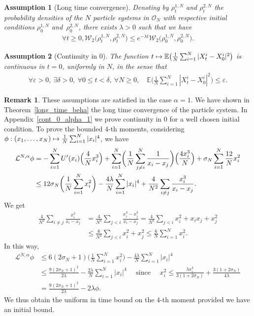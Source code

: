 \documentclass[10pt]{amsart}
\newcommand\mto{\mathchoice{\longmapsto}{\mapsto}{\mapsto}{\mapsto}}
\let\epsilon\varepsilon
\theoremstyle{plain}
\newtheorem{assumption}{Assumption}
\theoremstyle{definition}
\newtheorem{remark}{Remark}[section]
\begin{document}
\begin{assumption}[Long time convergence]\label{Hyp_long_time_cv}
Denoting by $\rho^{1,N}_t$ and $\rho^{2,N}_t$ the probability densities of the $N$ particle systems in $\mathcal{O}_N$ with respective initial conditions $\rho^{1,N}_0$ and~$\rho^{2,N}_0$, there exists $\lambda>0$ such that we have
\begin{align*}
\forall t\geq0, \mathcal{W}_2\bigl(\rho^{1,N}_t,\rho^{2,N}_t\bigr)\leq e^{-\lambda t}\mathcal{W}_2\bigl(\rho^{1,N}_0,\rho^{2,N}_0\bigr).
\end{align*}
\end{assumption}

\begin{assumption}[Continuity in 0]\label{Hyp_cont}
The function $t\mto\mathbb{E}\bigl(\frac{1}{N}\sum_{i=1}^N|X^i_t-X^i_0|^2\bigr)$ is continuous in $t=0$, uniformly in $N$, in the sense that
\begin{align*}
\forall \epsilon>0,\ \exists \delta>0,\ \forall 0\leq t<\delta,\ \forall N\geq0,\quad \mathbb{E}\biggl(\frac{1}{N}\sum_{i=1}^N|X^i_t-X^i_0|^2\biggr)\leq\epsilon.
\end{align*}
\end{assumption}

\begin{remark}
These assumptions are satisfied in the case $\alpha=1$. We have shown in Theorem~\ref{long_time_beha} the long time convergence of the particle system. In Appendix~\ref{cont_0_alpha_1} we prove continuity in 0 for a well chosen initial condition. To prove the bounded 4-th moments, considering $\phi:(x_1,\dots,x_N)\mto \frac{1}{N}\sum_{i=1}^N|x_i|^4$, we have
\begin{align*}
\mathcal{L}^{N,\alpha}\phi&=-\sum_{i=1}^NU'(x_i)\Bigl(\frac{4}{N}x_i^3\Bigr)+\sum_{i=1}^N\biggl(\frac{1}{N}\sum_{j\neq i}^N\frac{1}{x_i-x_j}\biggr)\Bigl(\frac{4x_i^3}{N}\Bigr)+\sigma_N\sum_{i=1}^N \frac{12}{N}x_i^2\\
&\leq 12\sigma_N\biggl(\frac{1}{N}\sum_{i=1}^N x_i^2\biggr)-\frac{4\lambda}{N}\sum_{i=1}^N|x_i|^4+\frac{4}{N^2}\sum_{i\neq j}\frac{x_i^3}{x_i-x_j}.
\end{align*}
We get
\begin{align*}
\frac{4}{N^2}\sum_{i\neq j}\frac{x_i^3}{x_i-x_j}&=\frac{4}{N^2}\sum_{j< i}\frac{x_i^3-x_j^3}{x_i-x_j}=\frac{4}{N^2}\sum_{j< i}x_i^2+x_ix_j+x_j^2\\
&\leq\frac{6}{N^2}\sum_{j< i}x_i^2+x_j^2\leq\frac{6}{N}\sum_{i=1}^Nx_i^2.
\end{align*}
In this way,
\begin{align*}
\mathcal{L}^{N,\alpha}\phi&\leq 6\left(2\sigma_N+1\right)\biggl(\frac{1}{N}\sum_{i=1}^N x_i^2\biggr)-\frac{4\lambda}{N}\sum_{i=1}^N|x_i|^4\\
&\leq \frac{9\left(2\sigma_N+1\right)^2}{2\lambda}-\frac{2\lambda}{N}\sum_{i=1}^N|x_i|^4\quad \text{ since }\quad x_i^2\leq \frac{\lambda x_i^4}{3(1+2\sigma_N)}+\frac{3(1+2\sigma_N)}{4\lambda }\\
&=\frac{9\left(2\sigma_N+1\right)^2}{2\lambda}-2\lambda\phi.
\end{align*}
We thus obtain the uniform in time bound on the 4-th moment provided we have an initial bound.
\end{remark}
\end{document}
